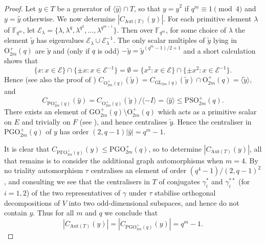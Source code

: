 \documentclass[twoside,a4paper,reqno,11pt]{amsart}
\newcommand{\wy}{\widehat{y}}
\renewcommand{\O}{\Omega}
\newcommand\bbF{\mathbb{F}}
\newcommand{\<}{\langle}
\renewcommand{\>}{\rangle}
\newcommand{\la}{\langle}
\newcommand{\ra}{\rangle}
\newcommand{\leqs}{\leqslant}
\newcommand{\Aut}{\mathrm{Aut}}
\newcommand{\GL}{\mathrm{GL}}
\theoremstyle{definition}
\begin{document}
\begin{proof}
    Let $y\in T$ be a generator of $\la \widehat{y} \ra \cap T$, so that $y = \widehat{y}^2$ if $q^m \equiv 1 \pmod 4$ and $y = \widehat{y}$ otherwise. 
    We now determine $|C_{\Aut(T)}(y)|$. 
    For each primitive element $\lambda$ of $\bbF_{q^m}$, let $\mathcal{E}_{\lambda} = \{\lambda, \lambda^{q}, \lambda^{q^{2}}, \ldots, \lambda^{q^{m-1}}\}$. Then over $\bbF_{q^m}$, for some choice of $\lambda$ the element $\widetilde{y}$ has eigenvalues $\mathcal{E}_{\lambda} \cup \mathcal{E}_{\lambda}^{-1}$. The only scalar multiples of $\widetilde{y}$ lying in $\mathrm{O}^+_{2m}(q)$ are $\widetilde{y}$ and (only if $q$ is odd) $-\widetilde{y} = \widetilde{y}^{(q^m-1)/2+1}$ %
    and a short calculation shows that
    \begin{equation*}
    \{x: x \in \mathcal{E}\} \cap \{\pm x : x \in \mathcal{E}^{-1}\} = \emptyset = \{x^2 : x \in \mathcal{E}\} \cap \{\pm x^{2} : x \in \mathcal{E}^{-1}\}.
    \end{equation*}
    Hence (see also the proof of \cite[Lemma 4.1.9]{KL_classical}) 
    $C_{\mathrm{O}^+_{2m}(q)}(\widetilde{y}) = C_{\GL_{2m}(q)}(\widetilde{y}) \cap \mathrm{O}^+_{2m}(q) = \la \widetilde{y} \ra$, and 
    \[ C_{\mathrm{PO}^+_{2m}(q)}(\wy) = C_{\mathrm{O}^+_{2m}(q)} (\widetilde{y})/\langle -I \rangle = \la \wy \ra \leqs \mathrm{PSO}^+_{2m}(q).\] 
    There exists an element of $\mathrm{GO}^+_{2m}(q) \setminus \mathrm{O}^+_{2m}(q)$ which acts as a primitive scalar on $E$ and trivially on $F$ (see \cite[p. 35]{BHRD}), and hence centralises $\widetilde{y}$. Hence the centraliser in $\mathrm{PGO}_{2m}^+(q)$ of $y$ %
    has order $(2, q-1)|\wy| = q^m-1$.  
     

    It is clear that $C_{\mathrm{P\Gamma O}_{2m}^+(q)}(y) \leqs \mathrm{PGO}^+_{2m}(q)$, so to determine $|C_{\Aut(T)}(y)|$, all that remains is to consider the additional graph automorphisms when $m = 4$. By \cite[Prop 1.4.1]{Kleidman} no triality automorphism $\tau$ centralises 
    an element of order $(q^4-1)/(2, q-1)^2$, and consulting \cite[Table 4.5.1]{GLS_CFSG3} we see that the centralisers in $T$ of conjugates $\gamma_i^\ast$ and $\gamma_i^{\ast \ast}$ (for $i = 1, 2$) of the two representatives of $\gamma$ under $\tau$ stabilise orthogonal decompositions of $V$ into two odd-dimensional subspaces, and hence do not contain $y$. 
    Thus for all $m$ and $q$ we conclude that \[|C_{\Aut(T)}(y)| = |C_{\mathrm{PGO}_{2m}^+(q)}(y)| = q^m-1.\]
    

\end{proof}
\end{document}
